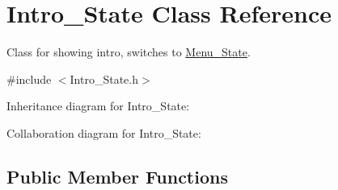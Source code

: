 \hypertarget{classIntro__State}{}\section{Intro\+\_\+\+State Class Reference}
\label{classIntro__State}


Class for showing intro, switches to \hyperlink{classMenu__State}{Menu\+\_\+\+State}.  




{\ttfamily \#include $<$Intro\+\_\+\+State.\+h$>$}



Inheritance diagram for Intro\+\_\+\+State\+:


Collaboration diagram for Intro\+\_\+\+State\+:
\subsection*{Public Member Functions}
